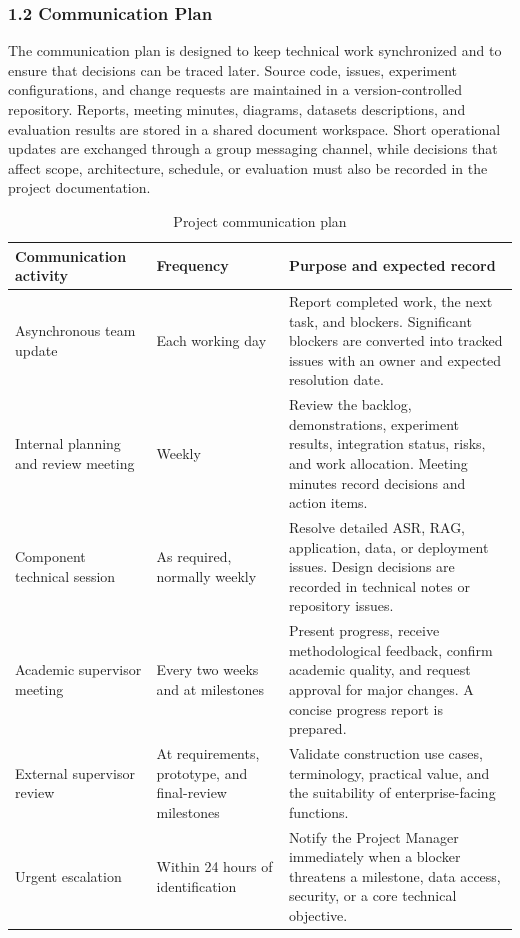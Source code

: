 \documentclass[11pt,a4paper]{article}
\begin{document}
\subsubsection{1.2 Communication Plan}

The communication plan is designed to keep technical work synchronized and to
ensure that decisions can be traced later. Source code, issues, experiment
configurations, and change requests are maintained in a version-controlled
repository. Reports, meeting minutes, diagrams, datasets descriptions, and
evaluation results are stored in a shared document workspace. Short operational
updates are exchanged through a group messaging channel, while decisions that
affect scope, architecture, schedule, or evaluation must also be recorded in
the project documentation.

\begin{table}[htbp]
\centering
\caption{Project communication plan}
\label{tab:communication-plan}
\small
\renewcommand{\arraystretch}{1.25}
\begin{tabularx}{\textwidth}{|p{}|p{}|X|}
\hline
\rowcolor{tableheader}
\textbf{Communication activity} & \textbf{Frequency} &
\textbf{Purpose and expected record} \\
\hline
Asynchronous team update & Each working day &
Report completed work, the next task, and blockers. Significant blockers are
converted into tracked issues with an owner and expected resolution date. \\
\hline
Internal planning and review meeting & Weekly &
Review the backlog, demonstrations, experiment results, integration status,
risks, and work allocation. Meeting minutes record decisions and action items. \\
\hline
Component technical session & As required, normally weekly &
Resolve detailed ASR, RAG, application, data, or deployment issues. Design
decisions are recorded in technical notes or repository issues. \\
\hline
Academic supervisor meeting & Every two weeks and at milestones &
Present progress, receive methodological feedback, confirm academic quality,
and request approval for major changes. A concise progress report is prepared. \\
\hline
External supervisor review & At requirements, prototype, and final-review
milestones & Validate construction use cases, terminology, practical value,
and the suitability of enterprise-facing functions. \\
\hline
Urgent escalation & Within 24 hours of identification &
Notify the Project Manager immediately when a blocker threatens a milestone,
data access, security, or a core technical objective. \\
\hline
\end{tabularx}
\end{table}
\FloatBarrier
\end{document}
